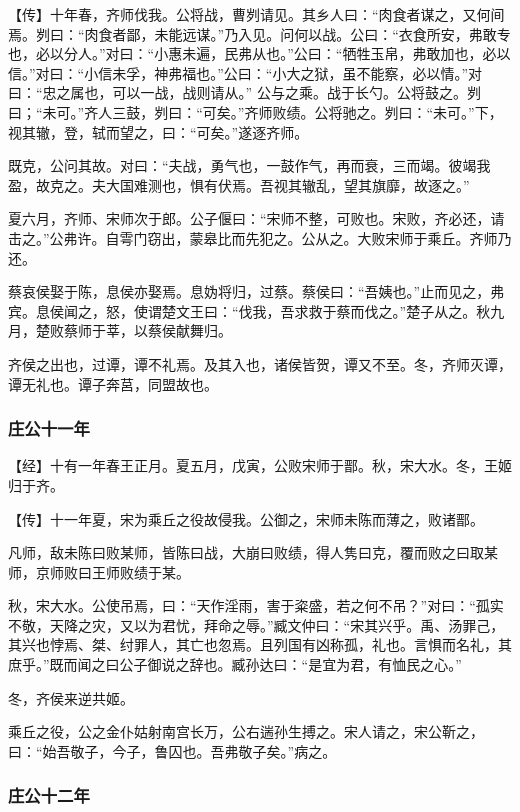 \documentclass[]{article}
\begin{document}
【传】十年春，齐师伐我。公将战，曹刿请见。其乡人曰：``肉食者谋之，又何间焉。刿曰：``肉食者鄙，未能远谋。''乃入见。问何以战。公曰：``衣食所安，弗敢专也，必以分人。''对曰：``小惠未遍，民弗从也。''公曰：``牺牲玉帛，弗敢加也，必以信。''对曰：``小信未孚，神弗福也。''公曰：``小大之狱，虽不能察，必以情。''对曰：``忠之属也，可以一战，战则请从。''
公与之乘。战于长勺。公将鼓之。刿曰；``未可。''齐人三鼓，刿曰：``可矣。''齐师败绩。公将驰之。刿曰：``未可。''下，视其辙，登，轼而望之，曰：``可矣。''遂逐齐师。

既克，公问其故。对曰：``夫战，勇气也，一鼓作气，再而衰，三而竭。彼竭我盈，故克之。夫大国难测也，惧有伏焉。吾视其辙乱，望其旗靡，故逐之。''

夏六月，齐师、宋师次于郎。公子偃曰：``宋师不整，可败也。宋败，齐必还，请击之。''公弗许。自雩门窃出，蒙皋比而先犯之。公从之。大败宋师于乘丘。齐师乃还。

蔡哀侯娶于陈，息侯亦娶焉。息妫将归，过蔡。蔡侯曰：``吾姨也。''止而见之，弗宾。息侯闻之，怒，使谓楚文王曰：``伐我，吾求救于蔡而伐之。''楚子从之。秋九月，楚败蔡师于莘，以蔡侯献舞归。

齐侯之出也，过谭，谭不礼焉。及其入也，诸侯皆贺，谭又不至。冬，齐师灭谭，谭无礼也。谭子奔莒，同盟故也。

\hypertarget{header-n432}{%
\subsubsection{庄公十一年}\label{header-n432}}

【经】十有一年春王正月。夏五月，戊寅，公败宋师于鄑。秋，宋大水。冬，王姬归于齐。

【传】十一年夏，宋为乘丘之役故侵我。公御之，宋师未陈而薄之，败诸鄑。

凡师，敌未陈曰败某师，皆陈曰战，大崩曰败绩，得人隽曰克，覆而败之曰取某师，京师败曰王师败绩于某。

秋，宋大水。公使吊焉，曰：``天作淫雨，害于粢盛，若之何不吊？''对曰：``孤实不敬，天降之灾，又以为君忧，拜命之辱。''臧文仲曰：``宋其兴乎。禹、汤罪己，其兴也悖焉、桀、纣罪人，其亡也忽焉。且列国有凶称孤，礼也。言惧而名礼，其庶乎。''既而闻之曰公子御说之辞也。臧孙达曰：``是宜为君，有恤民之心。''

冬，齐侯来逆共姬。

乘丘之役，公之金仆姑射南宫长万，公右遄孙生搏之。宋人请之，宋公靳之，曰：``始吾敬子，今子，鲁囚也。吾弗敬子矣。''病之。

\hypertarget{header-n441}{%
\subsubsection{庄公十二年}\label{header-n441}}
\end{document}
